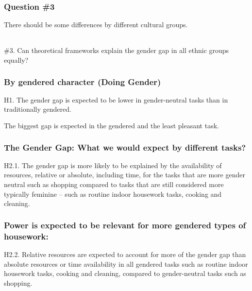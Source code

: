 \documentclass{beamer}
\begin{document}
\begin{frame}
\frametitle{Question \#3}

There should be some differences by different cultural groups.
 \\~\\

\begin{tcolorbox}[colback=green!5,colframe=green!40!black,title=Question 2] 
\#3. Can theoretical frameworks explain the gender gap in all ethnic groups equally?

\end{tcolorbox}

\end{frame}

\begin{frame}
\frametitle{By gendered character (Doing Gender)}

\begin{tcolorbox}[colback=blue!5,colframe=blue!40!black,title=Hypothesis 1] 
H1. The gender gap is expected to be lower in gender-neutral tasks than in traditionally gendered.
\end{tcolorbox}


The biggest gap is expected in the gendered and the least pleasant task.
\end{frame}

\begin{frame}
\frametitle{The Gender Gap: What we would expect by different tasks?}

\begin{tcolorbox}[colback=blue!5,colframe=blue!40!black,title=Hypothesis 2.1] 
H2.1. The gender gap is more likely to be explained by the availability of resources, relative or absolute, including time, for the tasks that are more gender neutral such as shopping compared to tasks that are still considered more typically feminine – such as routine indoor housework tasks, cooking and cleaning.
\end{tcolorbox}

\end{frame}

\begin{frame}
\frametitle{Power is expected to be relevant for more gendered types of housework:}

\begin{tcolorbox}[colback=blue!5,colframe=blue!40!black,title=Hypothesis 2.2] 
H2.2. Relative resources are expected to account for more of the gender gap than absolute resources or time availability in all gendered tasks such as routine indoor housework tasks, cooking and cleaning, compared to gender-neutral tasks such as shopping.
\end{tcolorbox}

\end{frame}
\end{document}
